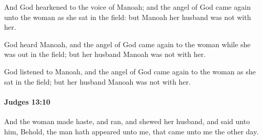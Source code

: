 			\begin{versebox}
					\item[BHS] 
					\item[ASV] And God hearkened to the voice of Manoah; and the angel of God came again unto the woman as she sat in the field: but Manoah her husband was not with her.
					\item[NIV] God heard Manoah, and the angel of God came again to the woman while she was out in the field; but her husband Manoah was not with her.
					\item[NRSV] God listened to Manoah, and the angel of God came again to the woman as she sat in the field; but her husband Manoah was not with her.
			\end{versebox}

		\paragraph{Judges 13:10} %
			\label{JUDGES-13-10}

			And the woman made haste, and ran, and shewed her husband, and said unto him, Behold, the man hath appeared unto me, that came unto me the other day.

